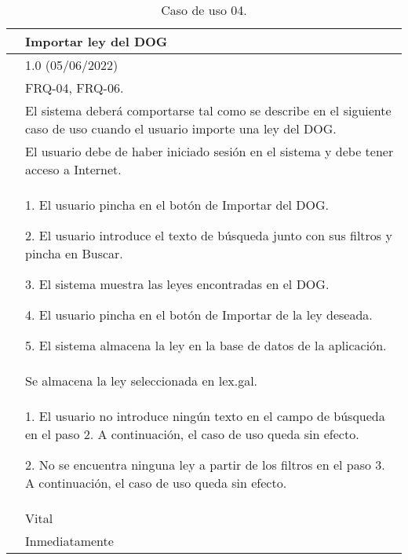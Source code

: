 \begin{table}[H]
\begin{center}
\begin{tabular}{|p{3cm}|p{10cm}|} \hline
\centering {\bf UC-04} & Importar ley del DOG  \\ \hline\hline
\centering {\bf Versión} & 1.0 (05/06/2022) \\ \hline
\centering {\bf Dependencias} &  FRQ-04, FRQ-06. \\ \hline
\centering {\bf Descripción} &  El sistema deberá comportarse tal como se describe en el siguiente caso de uso cuando el usuario importe una ley del DOG. \\ \hline
\centering {\bf Precondición} &  El usuario debe de haber iniciado sesión en el sistema y debe tener acceso a Internet. \\ \hline
\centering {\bf Secuencia normal} &  
1. El usuario pincha en el botón de Importar del DOG.

2. El usuario introduce el texto de búsqueda junto con sus filtros y pincha en Buscar.

3. El sistema muestra las leyes encontradas en el DOG.

4. El usuario pincha en el botón de Importar de la ley deseada.

5. El sistema almacena la ley en la base de datos de la aplicación.
\\ \hline
\centering {\bf Postcondición} &  Se almacena la ley seleccionada en lex.gal. \\ \hline
\centering {\bf Excepciones} & 
1. El usuario no introduce ningún texto en el campo de búsqueda en el paso 2. A continuación, el caso de uso queda sin efecto.

2. No se encuentra ninguna ley a partir de los filtros en el paso 3. A continuación, el caso de uso queda sin efecto.
\\ \hline
\centering {\bf Importancia} & Vital \\ \hline
\centering {\bf Urgencia} & Inmediatamente \\ \hline
\end{tabular}
\caption{Caso de uso 04.}
\label{enlaceUC4}
\end{center}
\end{table}

